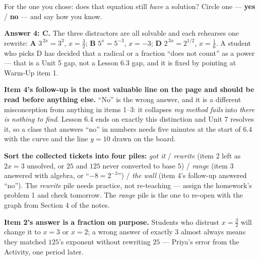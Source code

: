 \documentclass[10pt]{article}
\begin{document}
\begin{enumerate}[leftmargin=1.8em, itemsep=12pt]
        \vspace{4pt}
        For the one you chose: does that equation still \emph{have} a solution? Circle one ---
        \textcolor{keyred}{\textbf{yes}} \; / \; \textbf{no} --- and say how you know.

        \vspace{2pt}
\end{enumerate}

\begin{teachernote}
\textbf{Answer 4: C.} The three distractors are all solvable and each rehearses one rewrite:
\textbf{A} $3^{\,2x}=3^{3}$, $x=\frac32$; \textbf{B} $5^{x}=5^{-3}$, $x=-3$; \textbf{D}
$2^{\,3x}=2^{1/2}$, $x=\frac16$. A student who picks D has decided that a radical or a fraction ``does
not count'' as a power --- that is a Unit 5 gap, not a Lesson 6.3 gap, and it is fixed by pointing at
Warm-Up item 1.

\textbf{Item 4's follow-up is the most valuable line on the page and should be read before anything
else.} ``No'' is the wrong answer, and it is a different misconception from anything in items 1--3:
it collapses \emph{my method fails} into \emph{there is nothing to find}. Lesson 6.4 ends on exactly
this distinction and Unit 7 resolves it, so a class that answers ``no'' in numbers needs five minutes
at the start of 6.4 with the curve and the line $y=10$ drawn on the board.

\textbf{Sort the collected tickets into four piles:} \emph{got it} / \emph{rewrite} (item 2 left as
$2x=3$ unsolved, or $25$ and $125$ never converted to base $5$) / \emph{range} (item 3 answered with
algebra, or ``$-8=2^{-3}$'') / \emph{the wall} (item 4's follow-up answered ``no''). The
\emph{rewrite} pile needs practice, not re-teaching --- assign the homework's problem 1 and check
tomorrow. The \emph{range} pile is the one to re-open with the graph from Section 4 of the notes.

\textbf{Item 2's answer is a fraction on purpose.} Students who distrust $x=\frac32$ will change it to
$x=3$ or $x=2$; a wrong answer of exactly $3$ almost always means they matched $125$'s exponent
without rewriting $25$ --- Priya's error from the Activity, one period later.
\end{teachernote}
\end{document}
